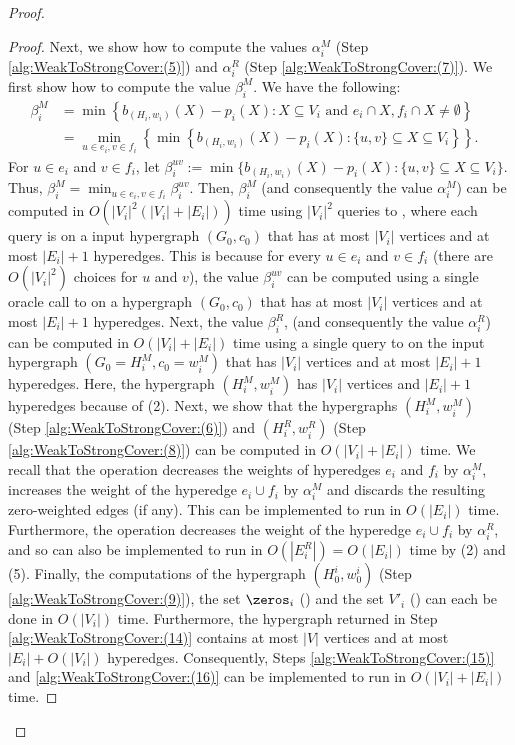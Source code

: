 \begin{proof}
\begin{proof}
Next, we show how to compute the values $\alpha_i^M$ (Step \ref{alg:WeakToStrongCover:(5)}) and $\alpha^R_i$ (Step \ref{alg:WeakToStrongCover:(7)}).  We first show how to compute the value $\beta_i^M$.
We have the following:
\begin{align*}
    \beta_i^M& = \min\left\{b_{(H_i,w_i)}(X) - p_i(X) : X \subseteq V_i \text{ and } e_i \cap X, f_i \cap X \not = \emptyset\right\} &\\
    & = \min_{u \in e_i, v \in f_i}\left\{\min\left\{b_{(H_i,w_i)}(X) - p_i(X) : \{u,v\} \subseteq X \subseteq V_i\right\}\right\}.&
\end{align*}
For $u \in e_i$ and $v \in f_i$, let $\beta_i^{uv} := \min\{b_{(H_i,w_i)}(X) - p_i(X) : \{u,v\} \subseteq X \subseteq V_i\}.$ Thus, $\beta_i^M = \min_{u \in e_i, v\in f_i}\beta_i^{uv}$.
Then, $\beta_i^M$ (and consequently the value $\alpha_i^M$) can be computed in $O(|V_i|^2(|V_i| + |E_i|))$ time using 
$|V_i|^2$ queries to , where each query is on a input hypergraph $(G_0, c_0)$ that has at most $|V_i|$ vertices and at most $|E_i|+1$ hyperedges. This is because for every $u \in e_i$ and $v \in f_i$ (there are $O(|V_i|^2)$ choices for $u$ and $v$), the value $\beta_i^{uv}$ can be computed using a single oracle call to  on a hypergraph $(G_0, c_0)$ that has at most $|V_i|$ vertices and at most $|E_i|+1$ hyperedges.
Next, the value $\beta^R_i$, (and consequently the value $\alpha^R_i$)  can be computed 
in $O(|V_i| + |E_i|)$ time using a single query to  on the input hypergraph $(G_0=H_i^M, c_0=w_i^M)$ that has  $|V_i|$ vertices and at most $|E_i|+1$ hyperedges. Here, the hypergraph $(H_i^M, w_i^M)$ has  $|V_i|$ vertices and $|E_i|+1$ hyperedges because of  (2).
Next, we show that the hypergraphs $(H_i^M, w_i^M)$ (Step \ref{alg:WeakToStrongCover:(6)}) and $(H_i^R, w_i^R)$ (Step \ref{alg:WeakToStrongCover:(8)}) can be computed in $O(|V_i| + |E_i|)$ time. We recall that the \merge operation decreases the weights of hyperedges $e_i$ and $f_i$ by $\alpha_i^M$,  increases the weight of the hyperedge $e_i\cup f_i$ by $\alpha_i^M$ and discards the resulting zero-weighted edges (if any). This can be implemented to run in $O(|E_i|)$ time. Furthermore, the \reduce operation decreases the weight of the hyperedge $e_i\cup f_i$ by $\alpha^R_i$, and so can also be implemented to run in $O(|E^R_i|) = O(|E_i|)$ time by (2) and (5). Finally, the computations of the hypergraph $(H^{i}_0, w^{i}_0)$ (Step \ref{alg:WeakToStrongCover:(9)}), the set $\zeros_i$ () and the set $V'_i$  () can each be done in $O(|V_i|)$ time. Furthermore, the hypergraph returned in Step \ref{alg:WeakToStrongCover:(14)} contains at most $|V|$ vertices and at most $|E_i| + O(|V_i|)$ hyperedges. Consequently, Steps \ref{alg:WeakToStrongCover:(15)} and \ref{alg:WeakToStrongCover:(16)}  can be implemented to run in $O(|V_i| + |E_i|)$ time. 
\end{proof}


\end{proof}
